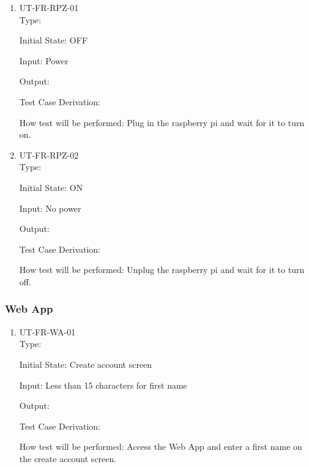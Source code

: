 \documentclass[12pt, titlepage]{article}
\begin{document}
{    \begin{enumerate}
    \item{UT-FR-RPZ-01\\}
    Type: 
    
    Initial State: OFF
    
    Input: Power
    
    Output: 
    
    Test Case Derivation: 
    
    How test will be performed: Plug in the raspberry pi and wait for it to turn on.
	
	\item{UT-FR-RPZ-02\\}
    Type: 
    
    Initial State: ON
    
    Input: No power
    
    Output: 
    
    Test Case Derivation: 
    
    How test will be performed: Unplug the raspberry pi and wait for it to turn off.
\end{enumerate}

\subsubsection{Web App}
    
    \begin{enumerate}
    \item{UT-FR-WA-01\\}
    Type: 
    
    Initial State: Create account screen
    
    Input: Less than 15 characters for first name
    
    Output: 
    
    Test Case Derivation: 
    
    How test will be performed: Access the Web App and enter a first name on the create account screen.
\end{enumerate}
} %
\end{document}
